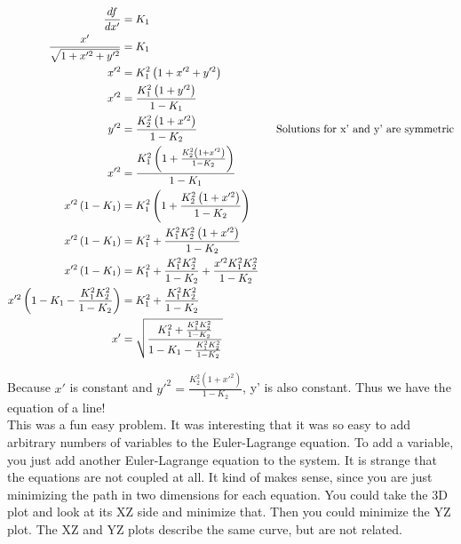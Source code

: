 \documentclass[10pt]{article} %
\begin{document}
\begin{align*}
  \frac{df}{dx'} &= K_1\\
  \frac{x'}{\sqrt{1 + x'^2 + y'^2}} &= K_1\\
  x'^2 &= K_1^2\left(1 + x'^2 + y'^2\right)\\
  x'^2 &= \frac{K_1^2\left(1 + y'^2\right)}{1-K_1}\\
  y'^2 &= \frac{K_2^2\left(1 + x'^2\right)}{1-K_2}
  \hspace*{1in} \mbox{Solutions for x' and y' are symmetric}\\
  x'^2 &= \frac{K_1^2\left(1 + \frac{K_2^2\left(1 + x'^2\right)}{1-K_2}\right)}{1-K_1}\\
  x'^2\left(1-K_1\right) &= K_1^2\left(1 + \frac{K_2^2\left(1 + x'^2\right)}{1-K_2}\right)\\
  x'^2\left(1-K_1\right) &= K_1^2 + \frac{K_1^2K_2^2\left(1 + x'^2\right)}{1-K_2}\\
  x'^2\left(1-K_1\right) &= K_1^2 + \frac{K_1^2K_2^2}{1-K_2} + \frac{x'^2K_1^2K_2^2}{1-K_2}\\
  x'^2\left(1-K_1 - \frac{K_1^2K_2^2}{1-K_2}\right) &= K_1^2 + \frac{K_1^2K_2^2}{1-K_2}\\
  x' &= \sqrt{\frac{K_1^2 + \frac{K_1^2K_2^2}{1-K_2}}{1-K_1 - \frac{K_1^2K_2^2}{1-K_2}}}\\
\end{align*}

Because $x'$ is constant and $y'^2 = \frac{K_2^2\left(1 + x'^2\right)}{1-K_2}$, y' is also constant. Thus we have the equation of a line!\\

This was a fun easy problem. It was interesting that it was so easy to add arbitrary numbers of variables to the Euler-Lagrange equation. To add a variable, you just add another Euler-Lagrange equation to the system. It is strange that the equations are not coupled at all. It kind of makes sense, since you are just minimizing the path in two dimensions for each equation. You could take the 3D plot and look at its XZ side and minimize that. Then you could minimize the YZ plot. The XZ and YZ plots describe the same curve, but are not related.
\end{document}
